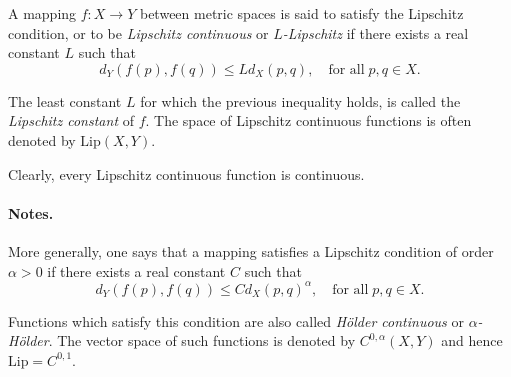 \documentclass{article}
\begin{document}
A mapping $f: X \to Y$ between metric spaces is said to satisfy the
Lipschitz condition, or to be \emph{Lipschitz continuous} or \emph{$L$-Lipschitz} if there exists a real constant $L$ such
that
$$ d_Y(f(p),f(q)) \leq L d_X(p,q),\quad \text{for all}\; p,q\in X.$$

The least constant $L$ for which the previous inequality holds, is called the \emph{Lipschitz constant} of $f$.
The space of Lipschitz continuous functions is often denoted by $\mathrm{Lip}(X,Y)$.

Clearly, every Lipschitz continuous function is continuous.

\paragraph{Notes.}
More generally, one says that a mapping satisfies
a Lipschitz condition of order $\alpha>0$ if there exists a real constant $C$ such that
$$ d_Y(f(p),f(q)) \leq C d_X(p,q)^\alpha,\quad \text{for all}\; p,q\in X.$$

Functions which satisfy this condition are also called \emph{H{\"o}lder continuous} or \emph{$\alpha$-H{\"o}lder}. The vector space of such functions is denoted by $C^{0,\alpha}(X,Y)$ and hence $\mathrm{Lip}=C^{0,1}$.
\end{document}
